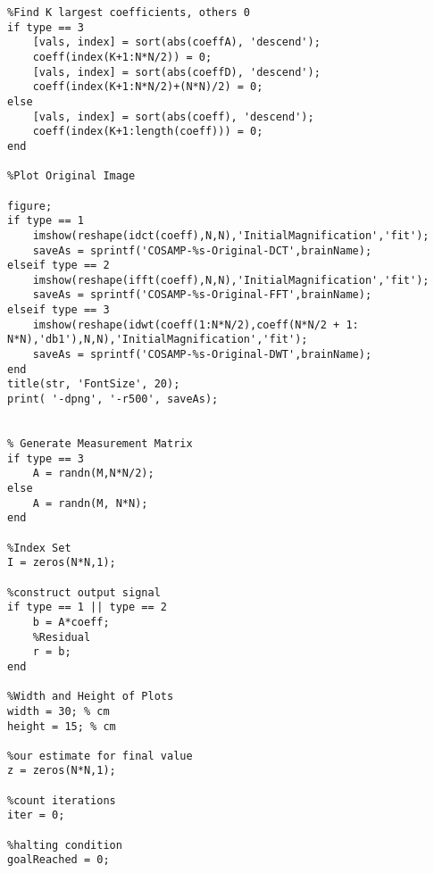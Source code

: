 \documentclass[titlepage,oneside, 12pt]{book}
\theoremstyle{break}
\begin{document}
\begin{appendices}
\begin{lstlisting}
%Find K largest coefficients, others 0
if type == 3
    [vals, index] = sort(abs(coeffA), 'descend');
    coeff(index(K+1:N*N/2)) = 0;
    [vals, index] = sort(abs(coeffD), 'descend');
    coeff(index(K+1:N*N/2)+(N*N)/2) = 0;
else
    [vals, index] = sort(abs(coeff), 'descend');
    coeff(index(K+1:length(coeff))) = 0;
end

%Plot Original Image

figure;
if type == 1
    imshow(reshape(idct(coeff),N,N),'InitialMagnification','fit');
    saveAs = sprintf('COSAMP-%s-Original-DCT',brainName);
elseif type == 2
    imshow(reshape(ifft(coeff),N,N),'InitialMagnification','fit');
    saveAs = sprintf('COSAMP-%s-Original-FFT',brainName);
elseif type == 3
    imshow(reshape(idwt(coeff(1:N*N/2),coeff(N*N/2 + 1: N*N),'db1'),N,N),'InitialMagnification','fit'); 
    saveAs = sprintf('COSAMP-%s-Original-DWT',brainName);
end
title(str, 'FontSize', 20); 
print( '-dpng', '-r500', saveAs);


% Generate Measurement Matrix
if type == 3
    A = randn(M,N*N/2);
else
    A = randn(M, N*N);
end

%Index Set
I = zeros(N*N,1);

%construct output signal
if type == 1 || type == 2
    b = A*coeff;
    %Residual
    r = b;
end

%Width and Height of Plots
width = 30; % cm 
height = 15; % cm

%our estimate for final value
z = zeros(N*N,1);

%count iterations
iter = 0;

%halting condition
goalReached = 0;


\end{lstlisting}
\end{appendices}
\end{document}
